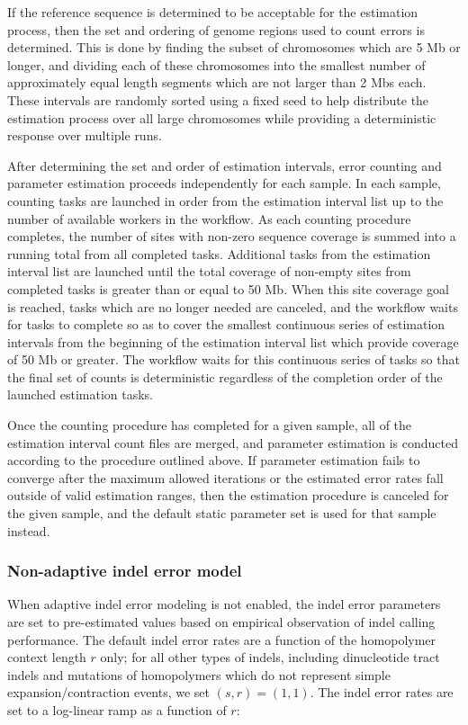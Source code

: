 \documentclass{article}
\begin{document}
If the reference sequence is determined to be acceptable for the estimation process, then the set and ordering of genome regions used to count errors is determined. This is done by finding the subset of chromosomes which are 5 Mb or longer, and dividing each of these chromosomes into the smallest number of approximately equal length segments which are not larger than 2 Mbs each. These intervals are randomly sorted using a fixed seed to help distribute the estimation process over all large chromosomes while providing a deterministic response over multiple runs.

After determining the set and order of estimation intervals, error counting and parameter estimation proceeds independently for each sample. In each sample, counting tasks are launched in order from the estimation interval list up to the number of available workers in the workflow. As each counting procedure completes, the number of sites with non-zero sequence coverage is summed into a running total from all completed tasks. Additional tasks from the estimation interval list are launched until the total coverage of non-empty sites from completed tasks is greater than or equal to 50 Mb. When this site coverage goal is reached, tasks which are no longer needed are canceled, and the workflow waits for tasks to complete so as to cover the smallest continuous series of estimation intervals from the beginning of the estimation interval list which provide coverage of 50 Mb or greater. The workflow waits for this continuous series of tasks so that the final set of counts is deterministic regardless of the completion order of the launched estimation tasks.

Once the counting procedure has completed for a given sample, all of the estimation interval count files are merged, and parameter estimation is conducted according to the procedure outlined above. If parameter estimation fails to converge after the maximum allowed iterations or the estimated error rates fall outside of valid estimation ranges, then the estimation procedure is canceled for the given sample, and the default static parameter set is used for that sample instead.

\subsubsection{Non-adaptive indel error model}
\label{sec:non_adaptive_indel_error}
When adaptive indel error modeling is not enabled, the indel error parameters are set to pre-estimated values based on empirical observation of indel calling performance. The default indel error rates are a function of the homopolymer context length $r$ only; for all other types of indels, including dinucleotide tract indels and mutations of homopolymers which do not represent simple expansion/contraction events, we set $(s,r) = (1,1)$. The indel error rates are set to a log-linear ramp as a function of $r$:
\end{document}
